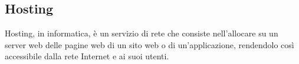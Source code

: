 
\subsection*{Hosting}
Hosting, in informatica, è un servizio di rete che consiste nell'allocare su un server web delle pagine web di un sito web o di un'applicazione, rendendolo così accessibile dalla rete Internet e ai suoi utenti.

